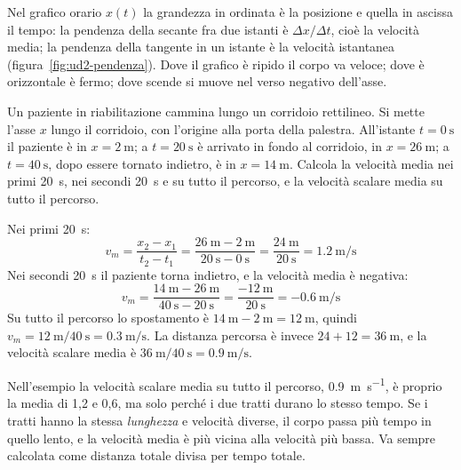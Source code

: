 Nel grafico orario $x(t)$ la grandezza in ordinata è la posizione e quella in ascissa il tempo: la pendenza della secante fra due istanti è $\Delta x / \Delta t$, cioè la velocità media; la pendenza della tangente in un istante è la velocità istantanea (figura~\ref{fig:ud2-pendenza}). Dove il grafico è ripido il corpo va veloce; dove è orizzontale è fermo; dove scende si muove nel verso negativo dell'asse.

\par\medskip
\noindent\begin{minipage}{\linewidth}
\centering

\label{fig:ud2-pendenza}
\end{minipage}
\medskip

\begin{esempio}
Un paziente in riabilitazione cammina lungo un corridoio rettilineo. Si mette l'asse $x$ lungo il corridoio, con l'origine alla porta della palestra. All'istante $t = \SI{0}{\second}$ il paziente è in $x = \SI{2}{\metre}$; a $t = \SI{20}{\second}$ è arrivato in fondo al corridoio, in $x = \SI{26}{\metre}$; a $t = \SI{40}{\second}$, dopo essere tornato indietro, è in $x = \SI{14}{\metre}$. Calcola la velocità media nei primi \SI{20}{\second}, nei secondi \SI{20}{\second} e su tutto il percorso, e la velocità scalare media su tutto il percorso.

Nei primi \SI{20}{\second}:
\[
  v_m = \frac{x_2 - x_1}{t_2 - t_1} = \frac{\SI{26}{\metre} - \SI{2}{\metre}}{\SI{20}{\second} - \SI{0}{\second}} = \frac{\SI{24}{\metre}}{\SI{20}{\second}} = \SI{1,2}{\metre\per\second}
\]
Nei secondi \SI{20}{\second} il paziente torna indietro, e la velocità media è negativa:
\[
  v_m = \frac{\SI{14}{\metre} - \SI{26}{\metre}}{\SI{40}{\second} - \SI{20}{\second}} = \frac{\SI{-12}{\metre}}{\SI{20}{\second}} = \SI{-0,6}{\metre\per\second}
\]
Su tutto il percorso lo spostamento è $\SI{14}{\metre} - \SI{2}{\metre} = \SI{12}{\metre}$, quindi $v_m = \SI{12}{\metre} / \SI{40}{\second} = \SI{0,3}{\metre\per\second}$. La distanza percorsa è invece $24 + 12 = \SI{36}{\metre}$, e la velocità scalare media è $\SI{36}{\metre} / \SI{40}{\second} = \SI{0,9}{\metre\per\second}$.
\end{esempio}

\begin{attenzione}
Nell'esempio la velocità scalare media su tutto il percorso, \SI{0,9}{\metre\per\second}, è proprio la media di 1,2 e 0,6, ma solo perché i due tratti durano lo stesso tempo. Se i tratti hanno la stessa \emph{lunghezza} e velocità diverse, il corpo passa più tempo in quello lento, e la velocità media è più vicina alla velocità più bassa. Va sempre calcolata come distanza totale divisa per tempo totale.
\end{attenzione}

